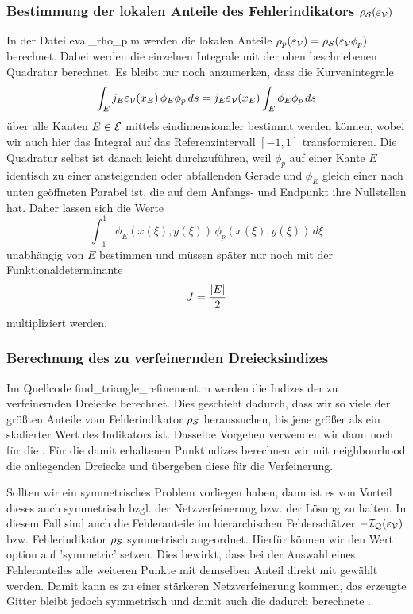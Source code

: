 \subsubsection{Bestimmung der lokalen Anteile des Fehlerindikators $\rho_{\mathcal S}(\varepsilon_{\mathcal V})$}

In der Datei {\ttfamily eval_rho_p.m} werden die lokalen Anteile $\rho_p (\varepsilon_{\mathcal V}) = \rho_{\mathcal S}(\varepsilon_{\mathcal V}\phi_p)$ berechnet. Dabei werden die einzelnen Integrale mit der oben beschriebenen Quadratur berechnet. Es bleibt nur noch anzumerken, dass die Kurvenintegrale
\[
	\int_E j_E \varepsilon_{\mathcal V}(x_E) \, \phi_E \phi_p \, ds = j_E \varepsilon_{\mathcal V}(x_E) \int_E \phi_E \phi_p \, ds
\]
über alle Kanten $E \in \mathcal E$ mittels eindimensionaler  bestimmt werden können, wobei wir auch hier das Integral auf das Referenzintervall $[-1,1]$ transformieren. Die Quadratur selbst ist danach leicht durchzuführen, weil $\phi_p$ auf einer Kante $E$ identisch zu einer ansteigenden oder abfallenden Gerade und $\phi_E$ gleich einer nach unten geöffneten Parabel ist, die auf dem Anfangs- und Endpunkt ihre Nullstellen hat. Daher lassen sich die Werte
\[
	\int_{-1}^1  \phi_E(x(\xi),y(\xi))  \, \phi_p(x(\xi),y(\xi)) \, d\xi
\]
unabhängig von $E$ bestimmen und müssen später nur noch mit der Funktionaldeterminante $$J=\frac{\lvert E\rvert}2$$ multipliziert werden.


\subsubsection{Berechnung des zu verfeinernden Dreiecksindizes}

Im Quellcode {\ttfamily find_triangle_refinement.m} werden die Indizes der zu verfeinernden Dreiecke berechnet. Dies geschieht dadurch, dass wir so viele der größten Anteile vom Fehlerindikator $\rho_{\mathcal S}$ heraussuchen, bis jene größer als ein skalierter Wert des Indikators ist. Dasselbe Vorgehen verwenden wir dann noch für die . Für die damit erhaltenen Punktindizes berechnen wir mit {\ttfamily neighbourhood} die anliegenden Dreiecke und übergeben diese für die Verfeinerung.

Sollten wir ein symmetrisches Problem vorliegen haben, dann ist es von Vorteil dieses auch symmetrisch bzgl. der Netzverfeinerung bzw. der Lösung zu halten. In diesem Fall sind auch die Fehleranteile im hierarchischen Fehlerschätzer $-\mathcal I_{\mathcal Q}(\varepsilon_{\mathcal V})$ bzw. Fehlerindikator $\rho_{\mathcal S}$ symmetrisch angeordnet. Hierfür können wir den Wert {\ttfamily option} auf {\ttfamily 'symmetric'} setzen. Dies bewirkt, dass bei der Auswahl eines Fehleranteiles alle weiteren Punkte mit demselben Anteil direkt mit gewählt werden. Damit kann es zu einer stärkeren Netzverfeinerung kommen, das erzeugte Gitter bleibt jedoch symmetrisch und damit auch die dadurch berechnete .



\newpage

